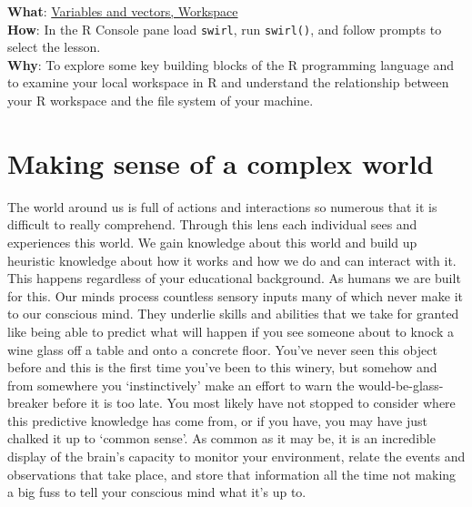 \documentclass[
  letterpaper,
]{latex/krantz}
\begin{document}
\begin{tcolorbox}[enhanced jigsaw, toprule=.15mm, bottomtitle=1mm, coltitle=black, title=\textcolor{quarto-callout-tip-color}{\faLightbulb}\hspace{0.5em}{Swirl}, left=2mm, colframe=quarto-callout-tip-color-frame, bottomrule=.15mm, colbacktitle=quarto-callout-tip-color!10!white, leftrule=.75mm, colback=white, titlerule=0mm, breakable, toptitle=1mm, opacityback=0, arc=.35mm, rightrule=.15mm, opacitybacktitle=0.6]

\textbf{What}: \href{https://github.com/lin380/swirl}{Variables and
vectors, Workspace}\\
\textbf{How}: In the R Console pane load \texttt{swirl}, run
\texttt{swirl()}, and follow prompts to select the lesson.\\
\textbf{Why}: To explore some key building blocks of the R programming
language and to examine your local workspace in R and understand the
relationship between your R workspace and the file system of your
machine.

\end{tcolorbox}

\hypertarget{making-sense-of-a-complex-world}{%
\section{Making sense of a complex
world}\label{making-sense-of-a-complex-world}}

The world around us is full of actions and interactions so numerous that
it is difficult to really comprehend. Through this lens each individual
sees and experiences this world. We gain knowledge about this world and
build up heuristic knowledge about how it works and how we do and can
interact with it. This happens regardless of your educational
background. As humans we are built for this. Our minds process countless
sensory inputs many of which never make it to our conscious mind. They
underlie skills and abilities that we take for granted like being able
to predict what will happen if you see someone about to knock a wine
glass off a table and onto a concrete floor. You've never seen this
object before and this is the first time you've been to this winery, but
somehow and from somewhere you `instinctively' make an effort to warn
the would-be-glass-breaker before it is too late. You most likely have
not stopped to consider where this predictive knowledge has come from,
or if you have, you may have just chalked it up to `common sense'. As
common as it may be, it is an incredible display of the brain's capacity
to monitor your environment, relate the events and observations that
take place, and store that information all the time not making a big
fuss to tell your conscious mind what it's up to.
\end{document}
